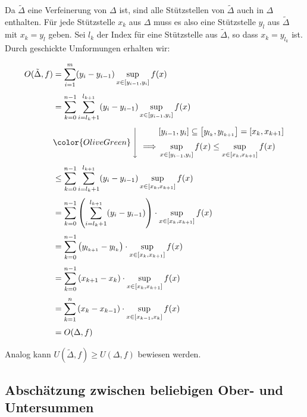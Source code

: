 \documentclass[fontsize=9pt,
               parskip=half-,
               DIV=14,
               listof=chapterentry,
               tocflat]{scrbook}
\begin{document}
\begin{proof*}
Da ${\tilde {\Delta }}$ eine Verfeinerung von $\Delta $ ist, sind alle Stützstellen von ${\tilde {\Delta }}$ auch in $\Delta $ enthalten. Für jede Stützstelle $x_{k}$ aus $\Delta $ muss es also eine Stützstelle $y_{l}$ aus ${\tilde {\Delta }}$ mit $x_{k}=y_{l}$ geben. Sei $l_{k}$ der Index für eine Stützstelle aus ${\tilde {\Delta }}$, so dass $x_{k}=y_{l_{k}}$ ist. Durch geschickte Umformungen erhalten wir:

\begin{align*}
O({\tilde {\Delta }},f)&=\sum _{i=1}^{m}(y_{i}-y_{i-1})\sup _{x\in [y_{i-1},y_{i}]}f(x)\\[0.3em]&=\sum _{k=0}^{n-1}\sum _{i=l_{k}+1}^{l_{k+1}}(y_{i}-y_{i-1})\sup _{x\in [y_{i-1},y_{i}]}f(x)\\[0.3em]&{\color {OliveGreen}\left\downarrow \ {\begin{aligned}&[y_{i-1},y_{i}]\subseteq \left[y_{l_{k}},y_{l_{k+1}}\right]=[x_{k},x_{k+1}]\\[0.3em]\implies &\sup _{x\in [y_{i-1},y_{i}]}f(x)\leq \sup _{x\in [x_{k},x_{k+1}]}f(x)\end{aligned}}\right.}\\[0.3em]&\leq \sum _{k=0}^{n-1}\sum _{i=l_{k}+1}^{l_{k+1}}(y_{i}-y_{i-1})\sup _{x\in [x_{k},x_{k+1}]}f(x)\\[0.3em]&=\sum _{k=0}^{n-1}\left(\sum _{i=l_{k}+1}^{l_{k+1}}(y_{i}-y_{i-1})\right)\cdot \sup _{x\in [x_{k},x_{k+1}]}f(x)\\[0.3em]&=\sum _{k=0}^{n-1}\left(y_{l_{k+1}}-y_{l_{k}}\right)\cdot \sup _{x\in [x_{k},x_{k+1}]}f(x)\\[0.3em]&=\sum _{k=0}^{n-1}\left(x_{k+1}-x_{k}\right)\cdot \sup _{x\in [x_{k},x_{k+1}]}f(x)\\[0.3em]&=\sum _{k=1}^{n}\left(x_{k}-x_{k-1}\right)\cdot \sup _{x\in [x_{k-1},x_{k}]}f(x)\\[0.3em]&=O(\Delta ,f)
\end{align*}

Analog kann $U({\tilde {\Delta }},f)\geq U(\Delta ,f)$ bewiesen werden.

\end{proof*}

\subsection{Abschätzung zwischen beliebigen Ober- und Untersummen}
\end{document}

